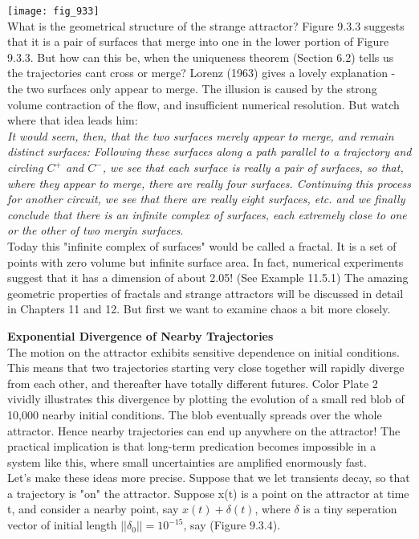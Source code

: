 \documentclass{article}
\newcommand\tab[1][1cm]{\hspace*{#1}}
\begin{document}
\texttt{[image: fig\_933]} \\ \tab
What is the geometrical structure of the strange attractor? Figure 9.3.3 suggests that it is a pair of surfaces that merge into one in the lower portion of Figure 9.3.3. But how can this be, when the uniqueness theorem (Section 6.2) tells us the trajectories cant cross or merge? Lorenz (1963) gives a lovely explanation - the two surfaces only appear to merge. The illusion is caused by the strong volume contraction of the flow, and insufficient numerical resolution. But watch where that idea leads him: \\ \tab
\textit{It would seem, then, that the two surfaces merely appear to merge, and remain distinct surfaces: Following these surfaces along a path parallel to a trajectory and circling $C^{+}$ and $C^{-}$, we see that each surface is really a pair of surfaces, so that, where they appear to merge, there are really four surfaces. Continuing this process for another circuit, we see that there are really eight surfaces, etc. and we finally conclude that there is an infinite complex of surfaces, each extremely close to one or the other of two mergin surfaces}. \\ \tab
Today this "infinite complex of surfaces" would be called a fractal. It is a set of points with zero volume but infinite surface area. In fact, numerical experiments suggest that it has a dimension of about 2.05! (See Example 11.5.1) The amazing geometric properties of fractals and strange attractors will be discussed in detail in Chapters 11 and 12. But first we want to examine chaos a bit more closely. 

\textbf {Exponential Divergence of Nearby Trajectories} \\ \tab
The motion on the attractor exhibits sensitive dependence on initial conditions. This means that two trajectories starting very close together will rapidly diverge from each other, and thereafter have totally different futures. Color Plate 2 vividly illustrates this divergence by plotting the evolution of a small red blob of 10,000 nearby initial conditions. The blob eventually spreads over the whole attractor. Hence nearby trajectories can end up anywhere on the attractor! The practical implication is that long-term predication becomes impossible in a system like this, where small uncertainties are amplified enormously fast. \\ \tab
Let's make these ideas more precise. Suppose that we let transients decay, so that a trajectory is "on" the attractor. Suppose x(t) is a point on the attractor at time t, and consider a nearby point, say $x(t)+\delta(t)$, where $\delta$ is a tiny seperation vector of initial length $||\delta_{0}||=10^{-15}$, say (Figure 9.3.4). \\
\end{document}
